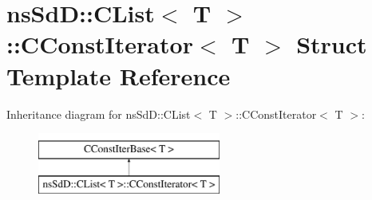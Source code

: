 \hypertarget{structnsSdD_1_1CList_1_1CConstIterator}{\section{ns\+Sd\+D\+:\+:C\+List$<$ T $>$\+:\+:C\+Const\+Iterator$<$ T $>$ Struct Template Reference}
\label{structnsSdD_1_1CList_1_1CConstIterator}
}
Inheritance diagram for ns\+Sd\+D\+:\+:C\+List$<$ T $>$\+:\+:C\+Const\+Iterator$<$ T $>$\+:\begin{figure}[H]
\begin{center}
\leavevmode
\includegraphics[height=2.000000cm]{structnsSdD_1_1CList_1_1CConstIterator}
\end{center}
\end{figure}
